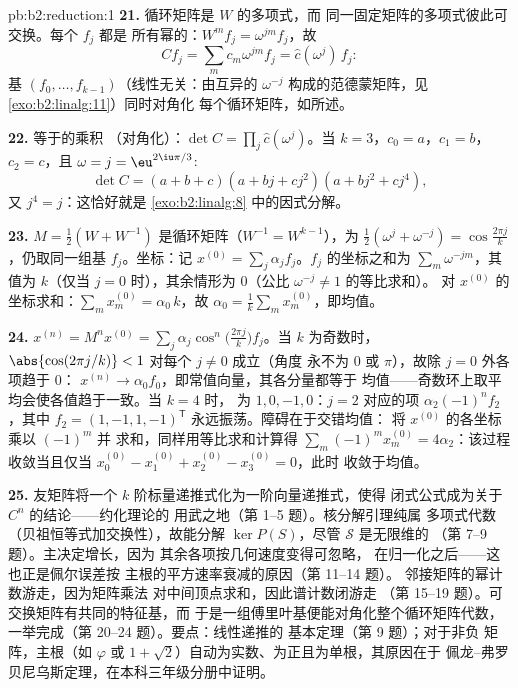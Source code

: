 \begin{solution}{pb:b2:reduction:1}
\textbf{21.} 循环矩阵是 $W$ 的多项式，而
同一固定矩阵的多项式彼此可交换。每个 $f_j$ 都是
所有幂的：$W^m f_j = \omega^{jm}f_j$，故
\[
Cf_j = \sum_m c_m\omega^{jm} f_j = \widehat c(\omega^j)\,f_j :
\]
基 $(f_0, \dots, f_{k-1})$（线性无关：由互异的
$\omega^{-j}$ 构成的范德蒙矩阵，见\cref{exo:b2:linalg:11}）同时对角化
每个循环矩阵，如所述。

\textbf{22.} 等于的乘积
（对角化）：$\det C = \prod_{j}\widehat c(\omega^j)$。当 $k
= 3$，$c_0 = a$，$c_1 = b$，$c_2 = c$，且 $\omega = j =
\eu^{2\iu\pi/3}$:
\[
\det C = (a + b + c)(a + bj + cj^2)(a + bj^2 + cj^4),
\]
又 $j^4 = j$：这恰好就是
\cref{exo:b2:linalg:8} 中的因式分解。

\textbf{23.} $M = \frac12(W + W^{-1})$ 是循环矩阵（$W^{-1} =
W^{k-1}$），为 $\frac12(\omega^j + \omega^{-j}) =
\cos\frac{2\pi j}k$，仍取同一组基 $f_j$。坐标：记
$x^{(0)} = \sum_j \alpha_j f_j$。$f_j$ 的坐标之和为
$\sum_m \omega^{-jm}$，其值为 $k$（仅当 $j = 0$
时），其余情形为 $0$（公比 $\omega^{-j} \neq 1$ 的等比求和）。
对 $x^{(0)}$ 的坐标求和：$\sum_m x^{(0)}_m =
\alpha_0\,k$，故 $\alpha_0 = \frac1k\sum_m x^{(0)}_m$，即均值。

\textbf{24.} $x^{(n)} = M^nx^{(0)} = \sum_j
\alpha_j\cos^n\bigl(\tfrac{2\pi j}k\bigr)f_j$。当 $k$ 为奇数时，
$\abs{\cos(2\pi j/k)} < 1$ 对每个 $j \neq 0$ 成立（角度
永不为 $0$ 或 $\pi$），故除 $j = 0$ 外各项趋于 $0$：
$x^{(n)} \to \alpha_0 f_0$，即常值向量，其各分量都等于
均值——奇数环上取平均会使各值趋于一致。当 $k = 4$ 时，
为 $1, 0, -1, 0$：$j = 2$ 对应的项
$\alpha_2(-1)^nf_2$，其中 $f_2 = (1, -1, 1, -1)^{\mathsf T}$
永远振荡。障碍在于交错均值：
将 $x^{(0)}$ 的各坐标乘以 $(-1)^m$ 并
求和，同样用等比求和计算得 $\sum_m
(-1)^mx^{(0)}_m = 4\alpha_2$：该过程收敛当且仅当
$x^{(0)}_0 - x^{(0)}_1 + x^{(0)}_2 - x^{(0)}_3 = 0$，此时
收敛于均值。

\textbf{25.} 友矩阵将一个
$k$ 阶标量递推式化为一阶向量递推式，使得
闭式公式成为关于 $C^n$ 的结论——约化理论的
用武之地（第 1--5 题）。核分解引理纯属
多项式代数（贝祖恒等式加交换性），故能分解
$\ker P(S)$，尽管 $\mathcal{S}$ 是无限维的
（第 7--9 题）。主决定增长，因为
其余各项按几何速度变得可忽略，
在归一化之后——这也正是佩尔误差按
主根的平方速率衰减的原因（第 11--14 题）。
邻接矩阵的幂计数游走，因为矩阵乘法
对中间顶点求和，因此谱计数闭游走
（第 15--19 题）。可交换矩阵有共同的特征基，而
于是一组傅里叶基便能对角化整个循环矩阵代数，
一举完成（第 20--24 题）。要点：线性递推的
基本定理（第 9 题）；对于非负
矩阵，主根（如 $\varphi$ 或 $1 +
\sqrt2$）自动为实数、为正且为单根，其原因在于
佩龙--弗罗贝尼乌斯定理，在本科三年级分册中证明。
\end{solution}
